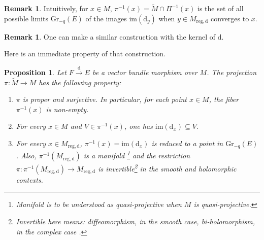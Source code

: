 \documentclass[10pt]{article}
\theoremstyle{plain}
\newtheorem{proposition}[lemma]{Proposition}
\theoremstyle{definition}
\newtheorem{remark}[lemma]{Remark}
\theoremstyle{remark}
\newcommand{\dd}{\mathrm{d}}
\begin{document}
\begin{remark}
 Intuitively, for $x\in M$, $\pi^{-1}(x)= \widetilde M\cap \Pi^{-1}(x)$ is the set of  all possible limits $\mathrm{Gr}_{-q}(E)$ of the images $\mathrm{im}(\dd_y)$ when $y\in M_{\mathrm{reg},\dd}$ converges to $x$.
\end{remark}
\begin{remark}
One can make  a similar construction with  the kernel of $\dd$.
\end{remark}
Here is an immediate property of that construction.
\begin{proposition}\label{prop:bi}Let $F\stackrel{\dd}{\longrightarrow}E$ be a vector bundle morphism over $M$. The projection $\pi\colon \widetilde M\rightarrow M$ has the following property:
 \begin{enumerate}
\item 
$\pi$ is proper and surjective. In particular, for each point $x\in M$, the fiber $\pi^{-1}(x)$ is non-empty.
\item {For every $x\in M$ and $V\in \pi^{-1}(x)$, one has $\mathrm{im}(\dd_x)\subseteq V$.}
\item  For every $x\in M_{\mathrm{reg},\dd}$,   $\pi^{-1}(x)=\mathrm{im}(\dd_x)$ is reduced to a point in $\mathrm{Gr}_{-q}(E)$. Also, $\pi^{-1}(M_{\mathrm{reg},\dd})$
is a manifold \footnote{Manifold is to be understood as quasi-projective when $M$ is quasi-projective.} and the restriction $\pi\colon \pi^{-1}(M_{\mathrm{reg},\dd})\longrightarrow M_{\mathrm{reg},\dd}$ is invertible\footnote{Invertible here means: diffeomorphism, in the smooth case, bi-holomorphism, in the complex case%
.} in the smooth and holomorphic contexts.
\end{enumerate}
\end{proposition}
\end{document}
